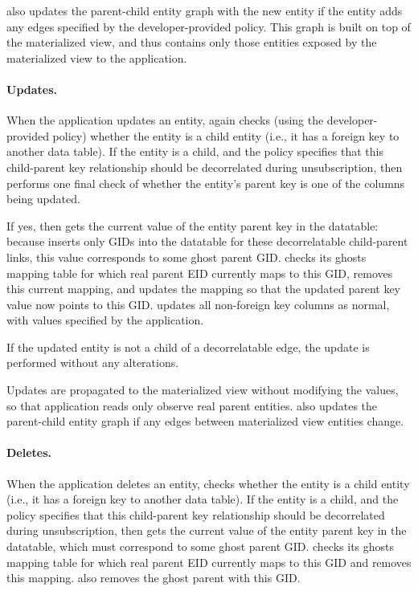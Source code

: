\sys also updates the parent-child entity graph with the new entity if the entity adds any edges
specified by the developer-provided policy. This graph is built on top of the materialized view, and
thus contains only those entities exposed by the materialized view to the application.

\paragraph{Updates.}
When the application updates an entity, \sys again checks (using the developer-provided policy) whether
the entity is a child entity (i.e., it has a foreign key to another data table). 
If the entity is a child, and the policy specifies that this child-parent key
relationship should be decorrelated during unsubscription, then \sys performs one final check of
whether the entity's parent key is one of the columns being updated.

If yes, then \sys gets the current value of the entity parent key in the datatable: because \sys
inserts only GIDs into the datatable for these decorrelatable child-parent links, this value 
corresponds to some ghost parent GID.
\sys checks its ghosts mapping table for which real parent EID currently maps to this GID, removes
this current mapping, and updates the mapping so that the updated parent key value now points to
this GID.
\sys updates all non-foreign key columns as normal, with values specified by the application.

If the updated entity is not a child of a decorrelatable edge, the update is performed without any
alterations.

Updates are propagated to the materialized view without modifying the values, so that application
reads only observe real parent entities.
\sys also updates the parent-child entity graph if any edges between materialized view entities change.

\paragraph{Deletes.}
When the application deletes an entity, \sys checks whether
the entity is a child entity (i.e., it has a foreign key to another data table). 
If the entity is a child, and the policy specifies that this child-parent key
relationship should be decorrelated during unsubscription, then \sys gets the current value of the
entity parent key in the datatable, which must correspond to some ghost parent GID.
\sys checks its ghosts mapping table for which real parent EID currently maps to this GID and removes
this mapping. \sys also removes the ghost parent with this GID.

